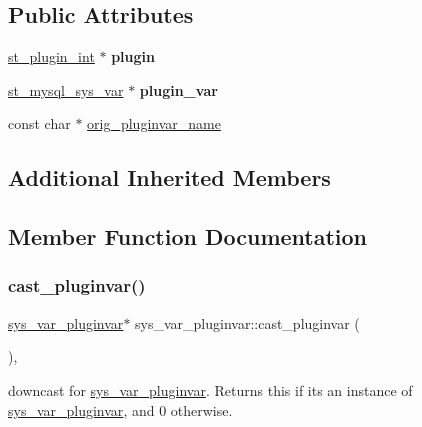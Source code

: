 \subsection*{Public Attributes}
\begin{DoxyCompactItemize}
\item 
\mbox{\label{classsys__var__pluginvar_a5b64a27ec19ffaf2312cd0976aebd367}} 
\mbox{\hyperlink{structst__plugin__int}{st\+\_\+plugin\+\_\+int}} $\ast$ {\bfseries plugin}
\item 
\mbox{\label{classsys__var__pluginvar_a6576c32ec09beda87e8f236ffdb377c7}} 
\mbox{\hyperlink{structst__mysql__sys__var}{st\+\_\+mysql\+\_\+sys\+\_\+var}} $\ast$ {\bfseries plugin\+\_\+var}
\item 
const char $\ast$ \mbox{\hyperlink{classsys__var__pluginvar_ab89f1595bd3b5dadd5ea766e622469d2}{orig\+\_\+pluginvar\+\_\+name}}
\end{DoxyCompactItemize}
\subsection*{Additional Inherited Members}


\subsection{Member Function Documentation}
\mbox{\label{classsys__var__pluginvar_a046db7b6bad8a43d72d0c82ae81653df}} 
\subsubsection{\texorpdfstring{cast\+\_\+pluginvar()}{cast\_pluginvar()}}
{\footnotesize\ttfamily \mbox{\hyperlink{classsys__var__pluginvar}{sys\+\_\+var\+\_\+pluginvar}}$\ast$ sys\+\_\+var\+\_\+pluginvar\+::cast\+\_\+pluginvar (\begin{DoxyParamCaption}{ }\end{DoxyParamCaption})\hspace{0.3cm}{\ttfamily [inline]}, {\ttfamily [virtual]}}

downcast for \mbox{\hyperlink{classsys__var__pluginvar}{sys\+\_\+var\+\_\+pluginvar}}. Returns this if it\textquotesingle{}s an instance of \mbox{\hyperlink{classsys__var__pluginvar}{sys\+\_\+var\+\_\+pluginvar}}, and 0 otherwise. 


